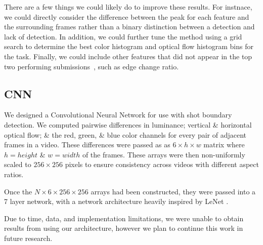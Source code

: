 There are a few things we could likely do to improve these results. For instnace, we could directly consider the difference between the peak for each feature and the surrounding frames rather than a binary distinction between a detection and lack of detection. In addition, we could further tune the method using a grid search to determine the best color histogram and optical flow histogram bins for the task. Finally, we could include other features that did not appear in the top two performing submissions~\cite{smeaton_video_2010}, such as edge change ratio.

\subsection*{CNN}
We designed a Convolutional Neural Network for use with shot boundary detection. We computed pairwise differences in luminance; vertical \& horizontal optical flow; \& the red, green, \& blue color channels for every pair of adjacent frames in a video. These differences were passed as as $6 \times h \times w$ matrix where $h = height$ \& $w = width$ of the frames. These arrays were then non-uniformly scaled to $256 \times 256$ pixels to ensure consistency across videos with different aspect ratios. 

Once the $N \times 6 \times 256 \times 256$ arrays had been constructed, they were passed into a 7 layer network, with a network architecture heavily inspired by LeNet \cite{lecun1998gradient}.

Due to time, data, and implementation limitations, we were unable to obtain results from using our architecture, however we plan to continue this work in future research. 


